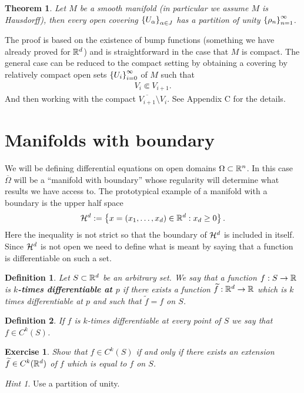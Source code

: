 \documentclass[12pt]{article}
\newtheorem{theorem}{Theorem}
\newtheorem{definition}{Definition}
\newtheorem{exercise}{Exercise}
\theoremstyle{remark}
\newtheorem*{hint}{Hint}
\newcommand{\tl}[1]{\widetilde{#1}}
\begin{document}
\begin{theorem}\label{partition}
	Let $M$ be a smooth manifold (in particular we assume $M$ is Hausdorff), then every open covering $ \left\{U_\alpha\right\}_{\alpha \in  J} $ has a partition of unity $\left\{\rho _n\right\}_{n=1}^\infty $.
\end{theorem}
The proof is based on the existence of bump functions (something we have already proved for $\mathbb{R}^d$) and is straightforward in the case that $M$ is compact. The general case can be reduced to the compact setting by obtaining a covering by relatively compact open sets $\left\{U_i\right\}_{i=0}^\infty $ of $M$ such that \begin{align*}
	V_{i} \Subset V_{i+1}.
\end{align*}
And then working with the compact $\overline{V_{i+1}} \setminus V_{i} $.    See \cite{tu2011manifolds} Appendix C for the details.



\section{Manifolds with boundary}\label{boundary}
We will be defining differential equations on open domains $\Omega \subset \mathbb{R}^n$. In this case $\overline{\Omega}$ will be a ``manifold with boundary'' whose regularity will determine what results we have access to. The prototypical example of a manifold with a boundary is the upper half space
\begin{align*}
	\mathcal{H}^d:=\left\{x=(x_1,\ldots,x_d)\in \mathbb{R}^d: x_d \geq 0\right\} .
\end{align*}
Here the inequality is not strict so that the boundary of $\mathcal{H}^d$ is included in itself. Since $\mathcal{H}^d$ is not open we need to define what is meant by saying that a function is differentiable on such a set.
\begin{definition}\label{smooth non open}
	Let $S \subset \mathbb{R}^d$ be an arbitrary set. We say that a function $f:S \to \mathbb{R}$ is  \textbf{$k$-times differentiable at $p$} if there exists a function $\tl{f}:\R^d \to \R$ which is $k$ times differentiable at  $p$ and such that $\tl{f}=f$ on $S$.
\end{definition}
\begin{definition}
	If $f$ is  $k$-times differentiable at every point of  $S$ we say that $f \in C^k(S)$.
\end{definition}
\begin{exercise}\label{ext}
	Show that $f\in  C^k(S)$ if and only if there exists an extension $\tl{f}\in C^k(\R^d)$ of $f$ which is equal to $f$ on $S$.
\end{exercise}
\begin{hint}
	Use a partition of unity.
\end{hint}
\end{document}
